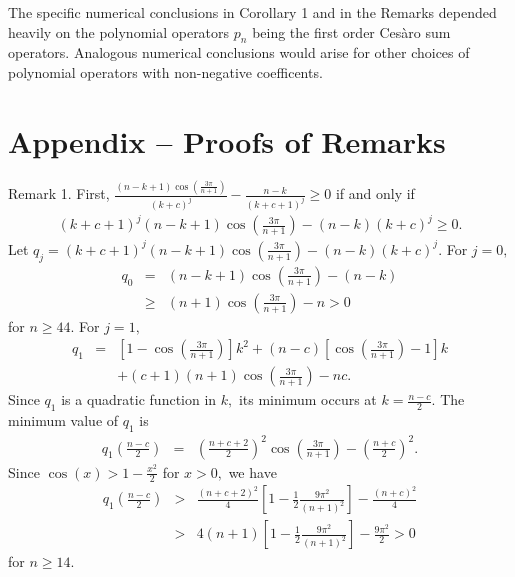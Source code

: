 \documentclass[final]{siamltex}
\begin{document}
The specific numerical conclusions in Corollary 1 and in the Remarks depended heavily on the polynomial operators  $p_n$ being  the  first order Ces\`{a}ro sum operators.   Analogous numerical conclusions would arise for other choices of polynomial operators with non-negative coefficents.



\section{Appendix -- Proofs of Remarks}


Remark 1.  First, $\frac{ (n-k+1) \cos \left( \frac{3 \pi}{n+1} \right) }{ (k+c)^{j} } - \frac{n-k}{(k+c+1)^{j}} \geq 0$ if and only if 
  \begin{eqnarray} 
\label{l4.1}
(k+c+1)^{j}(n-k+1) \cos \left( \frac{3 \pi}{n+1} \right) - (n-k)(k+c)^{j} \geq 0.
 \end{eqnarray}
 Let $q_{j} = (k+c+1)^{j}(n-k+1) \cos \left( \frac{3 \pi}{n+1} \right) - (n-k)(k+c)^{j}.$  
 For $j = 0,$ 
  \begin{eqnarray*}
   q_{0} & = & (n-k+1)\cos \left( \frac{3 \pi}{n+1} \right) - (n-k) \\
   & \geq & (n+1)\cos \left( \frac{3 \pi}{n+1} \right) - n   >  0  
 \end{eqnarray*}
 for $n \geq 44.$ 
 For $j = 1,$
  \begin{eqnarray*} q_{1} & = & \left[ 1 -  \cos \left( \frac{3 \pi}{n+1} \right) \right] k^{2} + (n-c) \left[ \cos \left( \frac{3 \pi}{n+1} \right) - 1 \right] k \\
 & &  + (c+1)(n+1) \cos \left( \frac{3 \pi}{n+1} \right) - nc.
 \end{eqnarray*}
 Since $q_{1}$ is a quadratic function in $k,$ its minimum  occurs at $k = \frac{n-c}{2}.$ 
 The minimum value of $q_{1}$ is 
 \begin{eqnarray*} q_{1} \left(\frac{n-c}{2} \right) & = & \left( \frac{n+c+2}{2} \right)^{2} \cos \left( \frac{3 \pi}{n+1} \right) - \left( \frac{n+c}{2} \right)^{2}. 
 \end{eqnarray*}
 Since $\cos(x) > 1 - \frac{x^{2}}{2}$ for $x > 0,$ we have 
 \begin{eqnarray*}
 q_{1} \left( \frac{n-c}{2} \right) & > & 
   \frac{ (n+c+2)^{2}}{4} \left[ 1- \frac{1}{2} \frac{9 \pi^{2}}{(n+1)^{2}} \right]  - \frac{(n+c)^{2}}{4} \\ 
   & > & 4(n+1) \left[ 1 - \frac{1}{2} \frac{9 \pi^{2}}{(n+1)^{2}} \right] - \frac{9 \pi^{2}}{2}  >  0
  \end{eqnarray*}
 for $n \geq 14.$
  
\end{document}
